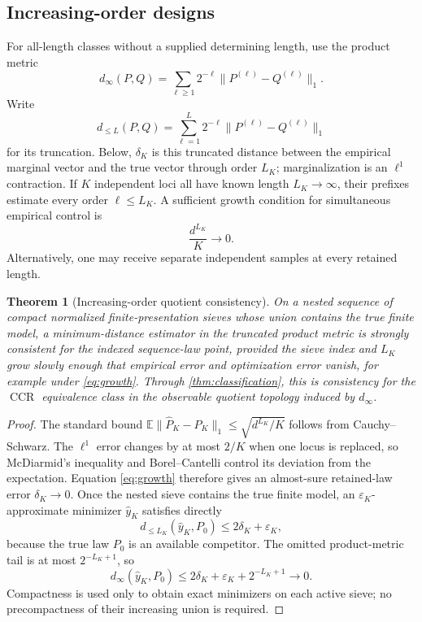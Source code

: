 \documentclass[11pt]{article}
\newtheorem{theorem}{Theorem}[section]
\newcommand{\CCR}{\operatorname{CCR}}
\begin{document}
\subsection{Increasing-order designs}

For all-length classes without a supplied determining length, use the product metric
\[
d_\infty(P,Q)=\sum_{\ell\ge1}2^{-\ell}\|P^{(\ell)}-Q^{(\ell)}\|_1.
\]
Write
\[
d_{\le L}(P,Q)=\sum_{\ell=1}^{L}2^{-\ell}\|P^{(\ell)}-Q^{(\ell)}\|_1
\]
for its truncation.  Below, $\delta_K$ is this truncated distance between the empirical marginal vector and the true vector through order $L_K$; marginalization is an $\ell^1$ contraction.
If $K$ independent loci all have known length $L_K\to\infty$, their prefixes estimate every order $\ell\le L_K$.  A sufficient growth condition for simultaneous empirical control is
\begin{equation}
\frac{d^{L_K}}{K}\longrightarrow0.
\label{eq:growth}
\end{equation}
Alternatively, one may receive separate independent samples at every retained length.

\begin{theorem}[Increasing-order quotient consistency]
\label{thm:sieve-consistency}
On a nested sequence of compact normalized finite-presentation sieves whose union contains the true finite model, a minimum-distance estimator in the truncated product metric is strongly consistent for the indexed sequence-law point, provided the sieve index and $L_K$ grow slowly enough that empirical error and optimization error vanish, for example under \eqref{eq:growth}.  Through \cref{thm:classification}, this is consistency for the $\CCR$ equivalence class in the observable quotient topology induced by $d_\infty$.
\end{theorem}

\begin{proof}
The standard bound $\mathbb E\|\widehat P_K-P_K\|_1\le\sqrt{d^{L_K}/K}$ follows from Cauchy--Schwarz.  The $\ell^1$ error changes by at most $2/K$ when one locus is replaced, so McDiarmid's inequality and Borel--Cantelli control its deviation from the expectation.  Equation \eqref{eq:growth} therefore gives an almost-sure retained-law error $\delta_K\to0$.  Once the nested sieve contains the true finite model, an $\varepsilon_K$-approximate minimizer $\widehat y_K$ satisfies directly
\[
d_{\le L_K}(\widehat y_K,P_0)
\le 2\delta_K+\varepsilon_K,
\]
because the true law $P_0$ is an available competitor.  The omitted product-metric tail is at most $2^{-L_K+1}$, so
\[
d_\infty(\widehat y_K,P_0)
\le 2\delta_K+\varepsilon_K+2^{-L_K+1}\longrightarrow0.
\]
Compactness is used only to obtain exact minimizers on each active sieve; no precompactness of their increasing union is required.
\end{proof}
\end{document}
